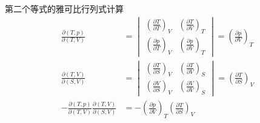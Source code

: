 \begin{example}
\begin{explain}
    第二个等式的雅可比行列式计算
\begin{align*}
        \frac{\partial(T,p)}{\partial(T,V)} &= 
        \begin{vmatrix}
        \left( \frac{\partial T}{\partial T} \right)_V & \left( \frac{\partial T}{\partial V} \right)_T \\
        \left( \frac{\partial p}{\partial T} \right)_V & \left( \frac{\partial p}{\partial V} \right)_T
        \end{vmatrix}
        = \left( \frac{\partial p}{\partial V} \right)_T
        \\
        \frac{\partial(T,V)}{\partial(S,V)} &= 
        \begin{vmatrix}
        \left( \frac{\partial T}{\partial S} \right)_V & \left( \frac{\partial T}{\partial V} \right)_S \\
        \left( \frac{\partial V}{\partial S} \right)_V & \left( \frac{\partial V}{\partial V} \right)_S
        \end{vmatrix}
        = \left( \frac{\partial T}{\partial S} \right)_V
        \\ 
        -\frac{\partial(T,p)}{\partial(T,V)} \frac{\partial(T,V)}{\partial(S,V)} 
&= -\left( \frac{\partial p}{\partial V} \right)_T \left( \frac{\partial T}{\partial S} \right)_V
\end{align*}
    \end{explain}
\end{example}






\ifx\allfiles\undefined

\fi
